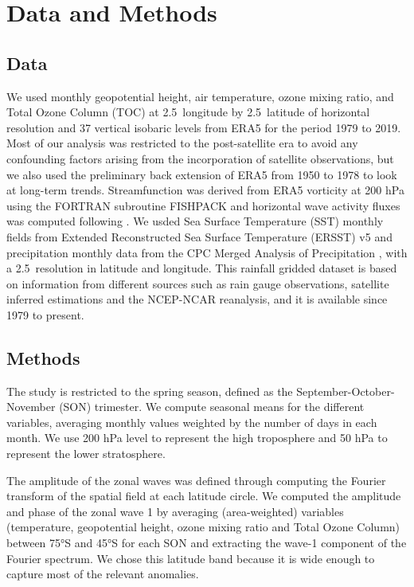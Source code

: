 \documentclass[smallextended]{svjour3}       %
\begin{document}
\hypertarget{methods}{%
\section{Data and Methods}\label{methods}}

\hypertarget{data}{%
\subsection{Data}\label{data}}

We used monthly geopotential height, air temperature, ozone mixing ratio, and Total Ozone Column (TOC) at 2.5\degree~longitude by 2.5\degree~latitude of horizontal resolution and 37 vertical isobaric levels from ERA5 \citep{era5} for the period 1979 to 2019.
Most of our analysis was restricted to the post-satellite era to avoid any confounding factors arising from the incorporation of satellite observations, but we also used the preliminary back extension of ERA5 from 1950 to 1978 \citep{era5be} to look at long-term trends.
Streamfunction was derived from ERA5 vorticity at 200 hPa using the FORTRAN subroutine FISHPACK \citep{fishpack} and horizontal wave activity fluxes was computed following \citet{plumb1985}.
We usded Sea Surface Temperature (SST) monthly fields from Extended Reconstructed Sea Surface Temperature (ERSST) v5 \citep{huang2017} and precipitation monthly data from the CPC Merged Analysis of Precipitation \citep{cmap}, with a 2.5\degree~resolution in latitude and longitude.
This rainfall gridded dataset is based on information from different sources such as rain gauge observations, satellite inferred estimations and the NCEP-NCAR reanalysis, and it is available since 1979 to present.

\hypertarget{methods-1}{%
\subsection{Methods}\label{methods-1}}

The study is restricted to the spring season, defined as the September-October-November (SON) trimester.
We compute seasonal means for the different variables, averaging monthly values weighted by the number of days in each month.
We use 200 hPa level to represent the high troposphere and 50 hPa to represent the lower stratosphere.

The amplitude of the zonal waves was defined through computing the Fourier transform of the spatial field at each latitude circle.
We computed the amplitude and phase of the zonal wave 1 by averaging (area-weighted) variables (temperature, geopotential height, ozone mixing ratio and Total Ozone Column) between 75°S and 45°S for each SON and extracting the wave-1 component of the Fourier spectrum.
We chose this latitude band because it is wide enough to capture most of the relevant anomalies.
\end{document}
